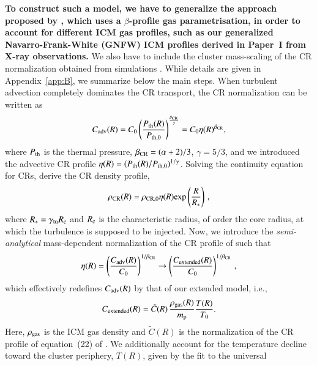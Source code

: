 \documentclass[useAMS,usenatbib]{mn2e}
\begin{document}
{\bf To construct such a model, we have to generalize the approach proposed by
  \citet{2011A&A...527A..99E}, which uses a $\beta$-profile gas
  parametrisation, in order to account for different ICM gas profiles, such as
  our generalized Navarro-Frank-White (GNFW) ICM profiles derived in Paper~I
  from X-ray observations.}  We also have to include the cluster mass-scaling of
the CR normalization obtained from simulations
\citep{2010MNRAS.409..449P}. While details are given in Appendix~\ref{app:B}, we
summarize below the main steps. When turbulent advection completely dominates the CR
transport, the CR normalization can be written as \citep{2011A&A...527A..99E}
\begin{equation}
C_{{\mathrm{adv}}}(R)=C_{0} \left( \frac{P_{{\mathrm{th}}}(R)}{P_{{\mathrm{th}},0}} \right)^{\frac{\beta_{{\mathrm{CR}}}}{\gamma}} = 
C_{0} \eta(R)^{\beta_{{\mathrm{CR}}}},
\label{eq:Csimple_1}
\end{equation} 
where $P_{{\mathrm{th}}}$ is the thermal pressure, $\beta_{{\mathrm{CR}}}=(\alpha+2)/3$, $\gamma=5/3$, 
and we introduced the advective CR profile $\eta(R)=(P_{{\mathrm{th}}}(R)/P_{{\mathrm{th}},0})^{1/\gamma}$. Solving the continuity
equation for CRs, \citet{2011A&A...527A..99E} derive the CR density profile,
\begin{equation}
\rho_{{\mathrm{CR}}}(R) = \rho_{{\mathrm{CR}},0} \eta(R) {\mathrm{exp}} \left( \frac{R}{R_{*}} \right) \, ,
\label{eg:rhoCR_1}
\end{equation} 
where $R_{*}=\gamma_{{\mathrm{{\mathrm{tu}}}}}R_{{\mathrm{c}}}$ and $R_{{\mathrm{c}}}$ is the characteristic 
radius, of order the core radius, at which the turbulence is supposed to be injected.
Now, we introduce the \emph{semi-analytical} mass-dependent normalization of the
CR profile of \cite{2010MNRAS.409..449P} such that
\begin{equation}
\eta(R) = \left( \frac{C_{{\mathrm{adv}}}(R)}{C_0} \right)^{1/\beta_{{\mathrm{CR}}}} \to
\left( \frac{C_{{\mathrm{extended}}}(R)}{C_0} \right)^{1/\beta_{{\mathrm{CR}}}} \, ,
\label{eq:eta}
\end{equation} 
which effectively redefines $C_{{\mathrm{adv}}}(R)$ by that of our extended model, i.e.,
\begin{equation}
C_{{\mathrm{extended}}}(R) =  \tilde{C}(R)\, \frac{\rho_{{\mathrm{gas}}}(R)}{m_{\mathrm{p}}} \frac{T(R)}{T_0}.
\label{eq:Cf}
\end{equation} 
Here, $\rho_{{\mathrm{gas}}}$ is the ICM gas density and $\tilde{C}(R)$ is the
normalization of the CR profile of equation~(22) of
\cite{2010MNRAS.409..449P}. We additionally account for the temperature decline
toward the cluster periphery, $T(R)$, given by the fit to the universal
\end{document}
